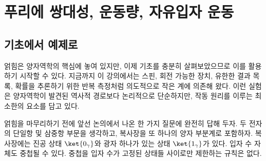 \chapter{푸리에 쌍대성, 운동량, 자유입자 운동}

\section{기초에서 예제로}

얽힘은 양자역학의 핵심에 놓여 있지만, 이제 기초를 충분히 살펴보았으므로 이를 활용하기 시작할 수 있다. 지금까지 이 강의에서는 스핀, 회전 가능한 장치, 유한한 결과 목록, 확률을 추론하기 위한 반복 측정처럼 의도적으로 작은 계에 의존해 왔다. 이런 실험은 양자역학이 발견된 역사적 경로보다 논리적으로 단순하지만, 작동 원리를 이루는 최소한의 요소를 담고 있다.

\begin{classroomqa}
\end{classroomqa}

\begin{classroomqa}
\end{classroomqa}

얽힘을 마무리하기 전에 앞선 논의에서 나온 한 가지 질문에 완전히 답해 두자. 두 전자의 단일항 및 삼중항 부문을 생각하고, 복사장을 또 하나의 양자 부분계로 포함하자. 복사장에는 진공 상태 \(\ket{0_\gamma}\)와 광자 하나가 있는 상태 \(\ket{1_\gamma}\)가 있다. 입자 수 자체도 중첩될 수 있다. 중첩을 입자 수가 고정된 상태들 사이로만 제한하는 규칙은 없다.

